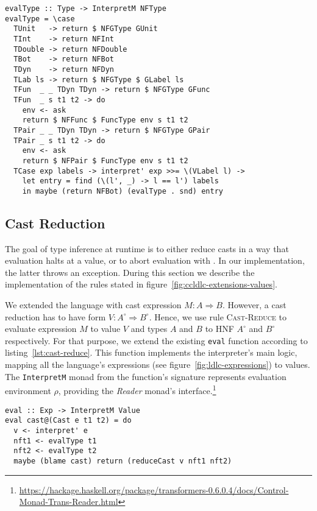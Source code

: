 \begin{lstlisting}[float,
  caption=Type evaluation (\texttt{Interpreter.hs}),
  label=lst:type-eval]
evalType :: Type -> InterpretM NFType
evalType = \case
  TUnit   -> return $ NFGType GUnit
  TInt    -> return NFInt
  TDouble -> return NFDouble
  TBot    -> return NFBot
  TDyn    -> return NFDyn
  TLab ls -> return $ NFGType $ GLabel ls
  TFun  _ _ TDyn TDyn -> return $ NFGType GFunc
  TFun  _ s t1 t2 -> do
    env <- ask
    return $ NFFunc $ FuncType env s t1 t2
  TPair _ _ TDyn TDyn -> return $ NFGType GPair
  TPair _ s t1 t2 -> do
    env <- ask
    return $ NFPair $ FuncType env s t1 t2
  TCase exp labels -> interpret' exp >>= \(VLabel l) ->
    let entry = find (\(l', _) -> l == l') labels
    in maybe (return NFBot) (evalType . snd) entry
\end{lstlisting}

\subsection{Cast Reduction}

The goal of type inference at runtime is to either reduce casts in a way that evaluation halts at a value, or to abort evaluation with \blame. In our implementation, the latter throws an exception. During this section we describe the implementation of the rules stated in figure~\ref{fig:ccldlc-extensions-values}.

We extended the language with cast expression $M : A \Rightarrow B$. However, a cast reduction has to have form $V : A^\circ \Rightarrow B^\circ$. Hence, we use rule \textsc{Cast-Reduce} to evaluate expression $M$ to value $V$ and types $A$ and $B$ to HNF $A^\circ$ and $B^\circ$ respectively. For that purpose, we extend the existing \texttt{eval} function according to listing~\ref{lst:cast-reduce}. This function implements the interpreter's main logic, mapping all the language's expressions (see figure~\ref{fig:ldlc-expressions}) to values. The \texttt{InterpretM} monad from the function's signature represents evaluation environment $\rho$, providing the \emph{Reader} monad's interface.\footnote{\url{https://hackage.haskell.org/package/transformers-0.6.0.4/docs/Control-Monad-Trans-Reader.html}}

\begin{lstlisting}[float,
  caption=Cast expression evaluation (\texttt{Interpreter.hs}),
  label=lst:cast-reduce]
eval :: Exp -> InterpretM Value
eval cast@(Cast e t1 t2) = do
  v <- interpret' e
  nft1 <- evalType t1
  nft2 <- evalType t2
  maybe (blame cast) return (reduceCast v nft1 nft2)
\end{lstlisting}

